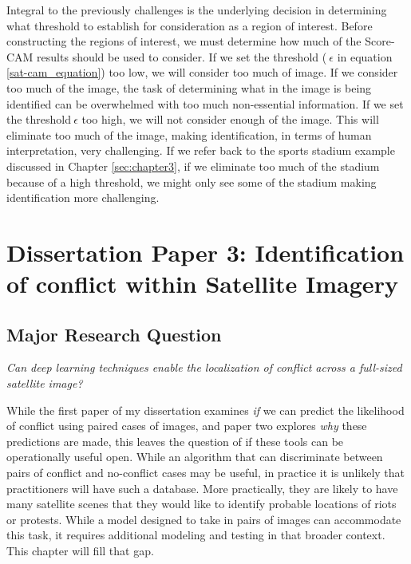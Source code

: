 
Integral to the previously challenges is the underlying decision in determining what threshold to establish for consideration as a region of interest.  Before constructing the regions of interest, we must determine how much of the Score-CAM results should be used to consider.  If we set the threshold ($\ \epsilon $ in equation \ref{sat-cam_equation}) too low, we will consider too much of image.  If we consider too much of the image, the task of determining what in the image is being identified can be overwhelmed with too much non-essential information.  If we set the threshold$\ \epsilon$ too high, we will not consider enough of the image.  This will eliminate too much of the image, making identification, in terms of human interpretation, very challenging.  If we refer back to the sports stadium example discussed in Chapter \ref{sec:chapter3}, if we eliminate too much of the stadium because of a high threshold, we might only see some of the stadium making identification more challenging.




\section{Dissertation Paper 3: Identification of conflict within Satellite Imagery }


\subsection{Major Research Question}
\textit{Can deep learning techniques enable the localization of conflict across a full-sized satellite image?}

While the first paper of my dissertation examines \textit{if} we can predict the likelihood of conflict using paired cases of images, and paper two explores \textit{why} these predictions are made, this leaves the question of if these tools can be operationally useful open.  While an algorithm that can discriminate between pairs of conflict and no-conflict cases may be useful, in practice it is unlikely that practitioners will have such a database.  More practically, they are likely to have many satellite scenes that they would like to identify probable locations of riots or protests.  While a model designed to take in pairs of images can accommodate this task, it requires additional modeling and testing in that broader context.  This chapter will fill that gap.

